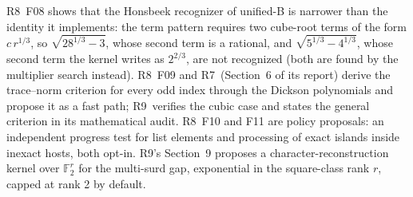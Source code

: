 \documentclass[11pt,oneside]{article}
\numberwithin{equation}{section}
\theoremstyle{definition}
\theoremstyle{remark}
\newcommand{\F}{\mathbb{F}}
\newcommand{\RVII}{\textsf{R7}}
\newcommand{\RVIII}{\textsf{R8}}
\newcommand{\RIX}{\textsf{R9}}
\begin{document}
\RVIII\ F08 shows that the Honsbeek recognizer of unified-B is narrower than the identity it implements: the term pattern requires two cube-root terms of the form $c\,r^{1/3}$, so $\sqrt{28^{1/3}-3}$, whose second term is a rational, and $\sqrt{5^{1/3}-4^{1/3}}$, whose second term the kernel writes as $2^{2/3}$, are not recognized (both are found by the multiplier search instead). \RVIII\ F09 and \RVII\ (Section~6 of its report) derive the trace--norm criterion for every odd index through the Dickson polynomials and propose it as a fast path; \RIX\ verifies the cubic case and states the general criterion in its mathematical audit. \RVIII\ F10 and F11 are policy proposals: an independent progress test for list elements and processing of exact islands inside inexact hosts, both opt-in. \RIX's Section~9 proposes a character-reconstruction kernel over $\F_2^r$ for the multi-surd gap, exponential in the square-class rank $r$, capped at rank 2 by default.
\end{document}
